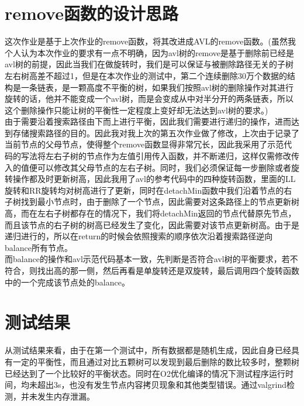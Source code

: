 \documentclass[UTF8]{ctexart}
\begin{document}
\pagestyle{fancy}
\fancyhead{}

\section{remove函数的设计思路}
这次作业是基于上次作业的remove函数，将其改进成AVL的remove函数。(虽然我个人认为本次作业的要求有一点不明确，因为avl树的remove是基于删除前已经是avl树的前提，因此当我们在做旋转时，我们是可以保证与被删除路径无关的子树左右树高差不超过1，但是在本次作业的测试中，第二个连续删除30万个数据的结构是一条链表，是一颗高度不平衡的树，如果我们按照avl树的删除操作对其进行旋转的话，他并不能变成一个avl树，而是会变成从中对半分开的两条链表，所以这个删除操作只能让树的平衡性一定程度上变好却无法达到avl树的要求。)\\
\indent 由于需要沿着搜索路径由下而上进行平衡，因此我们需要进行递归的操作，进而达到存储搜索路径的目的。因此我对我上次的第五次作业做了修改，上次由于记录了当前节点的父母节点，使得整个remove函数显得非常冗长，因此我采用了示范代码的写法将左右子树的节点作为左值引用传入函数，并不断递归，这样仅需修改传入的值便可以修改其父母节点的左右子树。同时，我们必须保证每一步删除或者旋转操作都及时更新树高，因此我用了avl的参考代码中的四种旋转函数，里面的LL旋转和RR旋转均对树高进行了更新，同时在detachMin函数中我们沿着节点的右子树找到最小节点时，由于删除了一个节点，因此需要对这条路径上的节点更新树高，而在左右子树都存在的情况下，我们将detachMin返回的节点代替原先节点，而且该节点的右子树的树高已经发生了变化，因此需要对该节点更新树高。由于是递归进行的，所以在return的时候会依照搜索的顺序依次沿着搜索路径逆向balance所有节点。\\
\indent 而balance的操作和avl示范代码基本一致，先判断是否符合avl树的平衡要求，若不符合，则找出高的那一侧，然后再看是单旋转还是双旋转，最后调用四个旋转函数中的一个完成该节点处的balance。

\section{测试结果}
从测试结果来看，由于在第一个测试中，所有数据都是随机生成，因此自身已经具有一定的平衡性，而且通过对比五颗树可以发现到最后删除的数比较多时，整颗树已经达到了一个比较好的平衡状态。同时在O2优化编译的情况下测试程序运行时间，均未超出3s，也没有发生节点内容拷贝现象和其他类型错误。通过valgrind检测，并未发生内存泄漏。
\end{document}
